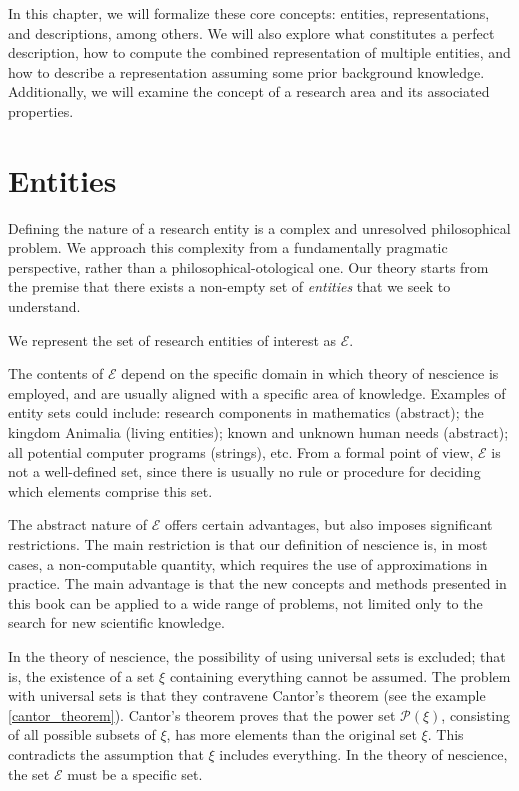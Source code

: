 In this chapter, we will formalize these core concepts: entities, representations, and descriptions, among others. We will also explore what constitutes a perfect description, how to compute the combined representation of multiple entities, and how to describe a representation assuming some prior background knowledge. Additionally, we will examine the concept of a research area and its associated properties.

%
%

\section{Entities}
\label{sec:descriptions_entities}

Defining the nature of a research entity is a complex and unresolved philosophical problem. We approach this complexity from a fundamentally pragmatic perspective, rather than a philosophical-otological one. Our theory starts from the premise that there exists a non-empty set of \emph{entities} that we seek to understand.

\begin{notation}
We represent the set of research entities of interest as $\mathcal{E}$.
\end{notation}

The contents of $\mathcal{E}$ depend on the specific domain in which theory of nescience is employed, and are usually aligned with a specific area of knowledge. Examples of entity sets could include: research components in mathematics (abstract); the kingdom Animalia (living entities); known and unknown human needs (abstract); all potential computer programs (strings), etc. From a formal point of view, $\mathcal{E}$ is not a well-defined set, since there is usually no rule or procedure for deciding which elements comprise this set.

The abstract nature of $\mathcal{E}$ offers certain advantages, but also imposes significant restrictions. The main restriction is that our definition of nescience is, in most cases, a non-computable quantity, which requires the use of approximations in practice. The main advantage is that the new concepts and methods presented in this book can be applied to a wide range of problems, not limited only to the search for new scientific knowledge.

In the theory of nescience, the possibility of using universal sets is excluded; that is, the existence of a set $\xi$ containing everything cannot be assumed. The problem with universal sets is that they contravene Cantor's theorem (see the example \ref{cantor_theorem}). Cantor's theorem proves that the power set $\mathcal{P}(\xi)$, consisting of all possible subsets of $\xi$, has more elements than the original set $\xi$. This contradicts the assumption that $\xi$ includes everything. In the theory of nescience, the set $\mathcal{E}$ must be a specific set.

